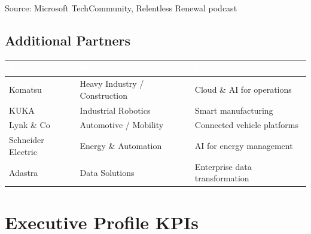 \documentclass[11pt,a4paper]{article}
\begin{document}
\textcolor{msgray}{\scriptsize Source: Microsoft TechCommunity, Relentless Renewal podcast}

\subsection{Additional Partners}

\begin{center}
\begin{longtable}{L{3.5cm}L{4cm}L{5.5cm}}
\toprule
{}
\textcolor{white}{\textbf{Partner}} & \textcolor{white}{\textbf{Industry}} & \textcolor{white}{\textbf{Focus Area}} \\
\midrule
Komatsu & Heavy Industry / Construction & Cloud \& AI for operations \\
KUKA & Industrial Robotics & Smart manufacturing \\
Lynk \& Co & Automotive / Mobility & Connected vehicle platforms \\
Schneider Electric & Energy \& Automation & AI for energy management \\
Adastra & Data Solutions & Enterprise data transformation \\
\bottomrule
\end{longtable}
\end{center}

\newpage

\section{Executive Profile KPIs}
\end{document}
